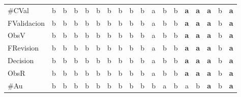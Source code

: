 {\begin{longtable}{lccccccccccccccccc}
\#CVal & \color{grisclaro}b & \color{grisclaro}b & \color{grisclaro}b & \color{grisclaro}b & \color{grisclaro}b & \color{grisclaro}b & \color{grisclaro}b & \color{grisclaro}b & \color{grisclaro}b & a & \color{grisclaro}b & \color{grisclaro}b & \textbf{\color{azuldos}a} & \textbf{\color{azuldos}a} & \textbf{\color{azuldos}a} & \color{grisclaro}b & \textbf{\color{azuldos}a} \\
FValidacion & \color{grisclaro}b & \color{grisclaro}b & \color{grisclaro}b & \color{grisclaro}b & \color{grisclaro}b & \color{grisclaro}b & \color{grisclaro}b & \color{grisclaro}b & \color{grisclaro}b & a & \color{grisclaro}b & \color{grisclaro}b & \textbf{\color{azuldos}a} & \textbf{\color{azuldos}a} & \textbf{\color{azuldos}a} & \color{grisclaro}b & \textbf{\color{azuldos}a} \\
ObsV & \color{grisclaro}b & \color{grisclaro}b & \color{grisclaro}b & \color{grisclaro}b & \color{grisclaro}b & \color{grisclaro}b & \color{grisclaro}b & \color{grisclaro}b & \color{grisclaro}b & a & \color{grisclaro}b & \color{grisclaro}b & \textbf{\color{azuldos}a} & \textbf{\color{azuldos}a} & \textbf{\color{azuldos}a} & \color{grisclaro}b & \textbf{\color{azuldos}a} \\
FRevision & \color{grisclaro}b & \color{grisclaro}b & \color{grisclaro}b & \color{grisclaro}b & \color{grisclaro}b & \color{grisclaro}b & \color{grisclaro}b & \color{grisclaro}b & \color{grisclaro}b & a & \color{grisclaro}b & \color{grisclaro}b & \textbf{\color{azuldos}a} & \textbf{\color{azuldos}a} & \textbf{\color{azuldos}a} & \color{grisclaro}b & \textbf{\color{azuldos}a} \\
Decision & \color{grisclaro}b & \color{grisclaro}b & \color{grisclaro}b & \color{grisclaro}b & \color{grisclaro}b & \color{grisclaro}b & \color{grisclaro}b & \color{grisclaro}b & \color{grisclaro}b & a & \color{grisclaro}b & \color{grisclaro}b & \textbf{\color{azuldos}a} & \textbf{\color{azuldos}a} & \textbf{\color{azuldos}a} & \color{grisclaro}b & \textbf{\color{azuldos}a} \\
ObsR & \color{grisclaro}b & \color{grisclaro}b & \color{grisclaro}b & \color{grisclaro}b & \color{grisclaro}b & \color{grisclaro}b & \color{grisclaro}b & \color{grisclaro}b & \color{grisclaro}b & a & \color{grisclaro}b & \color{grisclaro}b & \textbf{\color{azuldos}a} & \textbf{\color{azuldos}a} & \textbf{\color{azuldos}a} & \color{grisclaro}b & \textbf{\color{azuldos}a} \\
\#Au & \color{grisclaro}b & \color{grisclaro}b & \color{grisclaro}b & \color{grisclaro}b & \color{grisclaro}b & \color{grisclaro}b & \color{grisclaro}b & \color{grisclaro}b & \color{grisclaro}b & \color{grisclaro}b & a & \color{grisclaro}b & a & \color{grisclaro}b & \textbf{\color{azuldos}a} & \color{grisclaro}b & \textbf{\color{azuldos}a} \\

\end{longtable}}
